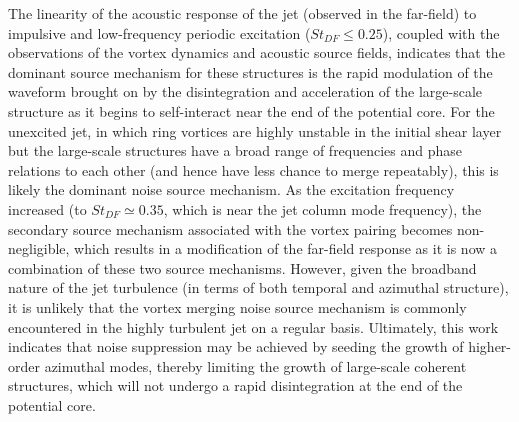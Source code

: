 The linearity of the acoustic response of the jet (observed in the far-field) to impulsive and low-frequency periodic excitation ($St_{DF} \leq 0.25$), coupled with the observations of the vortex dynamics and acoustic source fields, indicates that the dominant source mechanism for these structures is the rapid modulation of the waveform brought on by the disintegration and acceleration of the large-scale structure as it begins to self-interact near the end of the potential core.
For the unexcited jet, in which ring vortices are highly unstable in the initial shear layer but the large-scale structures have a broad range of frequencies and phase relations to each other (and hence have less chance to merge repeatably), this is likely the dominant noise source mechanism. 
As the excitation frequency increased (to $St_{DF} \simeq 0.35$, which is near the jet column mode frequency), the secondary source mechanism associated with the vortex pairing becomes non-negligible, which results in a modification of the far-field response as it is now a combination of these two source mechanisms.
However, given the broadband nature of the jet turbulence (in terms of both temporal and azimuthal structure), it is unlikely that the vortex merging noise source mechanism is commonly encountered in the highly turbulent jet on a regular basis.
Ultimately, this work indicates that noise suppression may be achieved by seeding the growth of higher-order azimuthal modes, thereby limiting the growth of large-scale coherent structures, which will not undergo a rapid disintegration at the end of the potential core.  